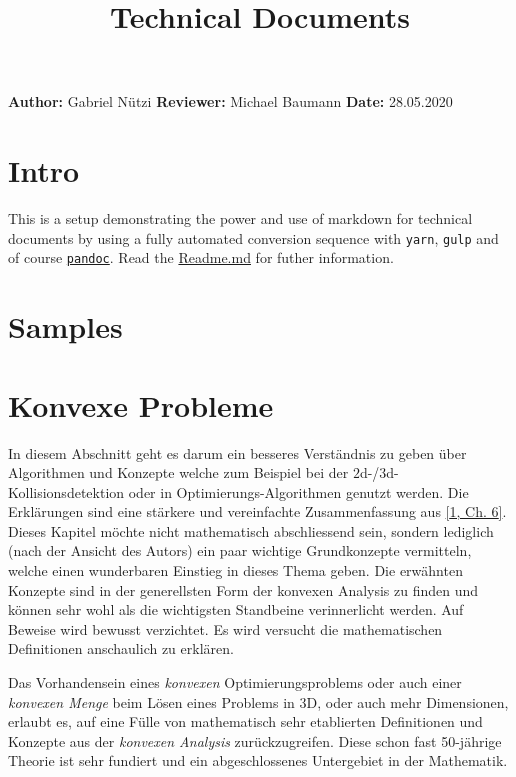 \documentclass[
  12pt,
  british,
  a4paper,
  twoside,
  titlepage,
  openright,
  numbers=noenddot,
  chapterprefix=true,
  headings=optiontohead,
  svgnames,
  dvipsnames]{scrreprt}
\title{Technical Documents}
\author{}
\date{}
\begin{document}
% 
{
\hypersetup{linkcolor=Black}
\setcounter{tocdepth}{2}
\tableofcontents
}
\textbf{Author:} Gabriel Nützi \textbf{Reviewer:} Michael Baumann
\textbf{Date:} 28.05.2020

\hypertarget{intro}{%
\chapter{Intro}\label{intro}}

This is a setup demonstrating the power and use of markdown for
technical documents by using a fully automated conversion sequence with
\texttt{yarn}, \texttt{gulp} and of course
\href{www.pandoc.org}{\texttt{pandoc}}. Read the
\href{https://github.com/gabyx/TechnicalMarkdown/blob/master/Readme.md}{Readme.md}
for futher information.

\hypertarget{samples}{%
\chapter{Samples}\label{samples}}

\hypertarget{konvexe-probleme}{%
\chapter{Konvexe Probleme}\label{konvexe-probleme}}

In diesem Abschnitt geht es darum ein besseres Verständnis zu geben über
Algorithmen und Konzepte welche zum Beispiel bei der
\(2\)d-/\(3\)d-Kollisionsdetektion oder in Optimierungs-Algorithmen
genutzt werden. Die Erklärungen sind eine stärkere und vereinfachte
Zusammenfassung aus \protect\hyperlink{ref-nuetzig_thesis_2016}{{[}1,
Ch. 6{]}}. Dieses Kapitel möchte nicht mathematisch abschliessend sein,
sondern lediglich (nach der Ansicht des Autors) ein paar wichtige
Grundkonzepte vermitteln, welche einen wunderbaren Einstieg in dieses
Thema geben. Die erwähnten Konzepte sind in der generellsten Form der
konvexen Analysis zu finden und können sehr wohl als die wichtigsten
Standbeine verinnerlicht werden. Auf Beweise wird bewusst verzichtet. Es
wird versucht die mathematischen Definitionen anschaulich zu erklären.

Das Vorhandensein eines \emph{konvexen} Optimierungsproblems oder auch
einer \emph{konvexen Menge} beim Lösen eines Problems in \(3\)D, oder
auch mehr Dimensionen, erlaubt es, auf eine Fülle von mathematisch sehr
etablierten Definitionen und Konzepte aus der \emph{konvexen Analysis}
zurückzugreifen. Diese schon fast 50-jährige Theorie ist sehr fundiert
und ein abgeschlossenes Untergebiet in der Mathematik.
\end{document}
